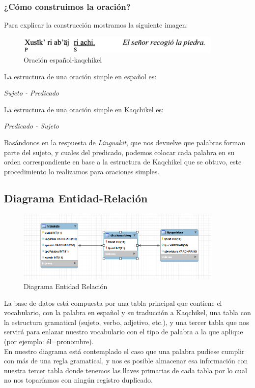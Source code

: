 \documentclass[a4paper,openright,11pt]{article}
\begin{document}
\subsubsection{¿Cómo construimos la oración?}
Para explicar la construcción mostramos la siguiente imagen:\\
\begin{figure}[H]
	\centering
	\includegraphics[width=0.9\textwidth]{oracion}
	\caption{Oración español-kaqchikel}
	\label{fig:kaq}
\end{figure}
La estructura de una oración simple en español es:
\begin{center}
	\textit{Sujeto - Predicado}\\
\end{center}

La estructura de una oración simple en Kaqchikel es:
\begin{center}
	\textit{Predicado - Sujeto}\\
\end{center}

Basándonos en la respuesta de \textit{Linguakit}, que nos devuelve que palabras forman parte del sujeto, y cuales del predicado, podemos colocar cada palabra en su orden correspondiente en base a la estructura de Kaqchikel que se obtuvo, este procedimiento lo realizamos para oraciones simples.

\newpage
\subsection{Diagrama Entidad-Relación}
\begin{figure}[H]
	\centering
	\includegraphics[width=0.9\textwidth]{er}
	\caption{Diagrama Entidad Relación}
	\label{fig:er}
\end{figure}
La base de datos está compuesta por una tabla principal que contiene el vocabulario, con la palabra en español y su traducción a Kaqchikel, una tabla con la estructura gramatical (sujeto, verbo, adjetivo, etc.), y una tercer tabla que nos servirá para enlazar nuestro vocabulario con el tipo de palabra a la que aplique (por ejemplo: él=pronombre).\\
En nuestro diagrama está contemplado el caso que una palabra pudiese cumplir con más de una regla gramatical, y nos es posible almacenar esa información con nuestra tercer tabla donde tenemos las llaves primarias de cada tabla por lo cual no nos toparíamos con ningún registro duplicado.
\end{document}
